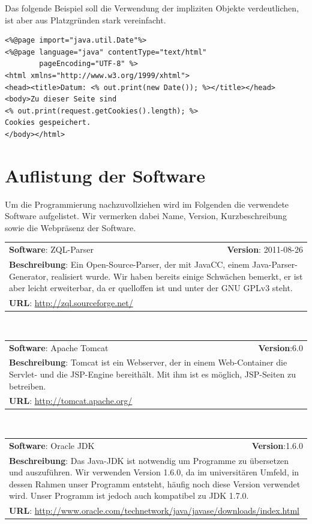 Das folgende Beispiel soll die Verwendung der impliziten Objekte verdeutlichen, ist aber aus Platzgründen stark vereinfacht.
\lstset{language=Java}
\begin{lstlisting}
<%@page import="java.util.Date"%>
<%@page language="java" contentType="text/html" 
		pageEncoding="UTF-8" %>
<html xmlns="http://www.w3.org/1999/xhtml">
<head><title>Datum: <% out.print(new Date()); %></title></head>
<body>Zu dieser Seite sind 
<% out.print(request.getCookies().length); %> 
Cookies gespeichert.
</body></html>
\end{lstlisting}

\section{Auflistung der Software}

Um die Programmierung nachzuvollziehen wird im Folgenden die verwendete Software aufgelistet. Wir vermerken dabei Name, Version, Kurzbeschreibung sowie die Webpräsenz der Software.

\begin{tabular}{p{9cm}r}
\textbf{Software}: ZQL-Parser & \textbf{Version}: 2011-08-26\\
\multicolumn{2}{p{1\textwidth}}{\textbf{Beschreibung}: Ein Open-Source-Parser, der mit JavaCC, einem Java-Parser-Generator, realisiert wurde. Wir haben bereits einige Schwächen bemerkt, er ist aber leicht erweiterbar, da er quelloffen ist und unter der GNU GPLv3 steht.}\\
\multicolumn{2}{l}{\textbf{URL}: \url{http://zql.sourceforge.net/}}
\end{tabular}\\

\begin{tabular}{p{9cm}r}
\textbf{Software}: Apache Tomcat & \textbf{Version}:6.0\\
\multicolumn{2}{p{1\textwidth}}{\textbf{Beschreibung}: Tomcat ist ein Webserver, der in einem Web-Container die Servlet- und die JSP-Engine bereithält. Mit ihm ist es möglich, JSP-Seiten zu betreiben.}\\
\multicolumn{2}{l}{\textbf{URL}: \url{http://tomcat.apache.org/}}
\end{tabular}\\

\begin{tabular}{p{9cm}r}
\textbf{Software}: Oracle JDK  & \textbf{Version}:1.6.0\\
\multicolumn{2}{p{1\textwidth}}{\textbf{Beschreibung}: Das Java-JDK ist notwendig um Programme zu übersetzen und auszuführen. Wir verwenden Version 1.6.0, da im universitären Umfeld, in dessen Rahmen unser Programm entsteht, häufig noch diese Version verwendet wird. Unser Programm ist jedoch auch kompatibel zu JDK 1.7.0.}\\
\multicolumn{2}{l}{\textbf{URL}: \url{http://www.oracle.com/technetwork/java/javase/downloads/index.html}}
\end{tabular}\\


